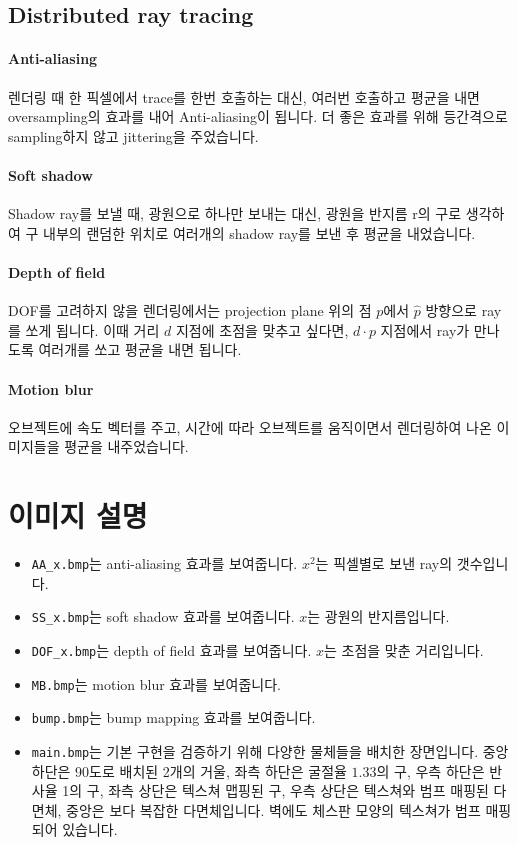 \documentclass{article}
\begin{document}
\subsection{Distributed ray tracing}

\paragraph{Anti-aliasing}

렌더링 때 한 픽셀에서 trace를 한번 호출하는 대신, 여러번 호출하고 평균을 내면 oversampling의 효과를 내어 Anti-aliasing이 됩니다.
더 좋은 효과를 위해 등간격으로 sampling하지 않고 jittering을 주었습니다.

\paragraph{Soft shadow}

Shadow ray를 보낼 때, 광원으로 하나만 보내는 대신, 광원을 반지름 r의 구로 생각하여 구 내부의 랜덤한 위치로 여러개의 shadow ray를 보낸 후 평균을 내었습니다.

\paragraph{Depth of field}

DOF를 고려하지 않을 렌더링에서는 projection plane 위의 점 $p$에서 $\hat{p}$ 방향으로 ray를 쏘게 됩니다.
이때 거리 $d$ 지점에 초점을 맞추고 싶다면, $d \cdot p$ 지점에서 ray가 만나도록 여러개를 쏘고 평균을 내면 됩니다.

\paragraph{Motion blur}

오브젝트에 속도 벡터를 주고, 시간에 따라 오브젝트를 움직이면서 렌더링하여 나온 이미지들을 평균을 내주었습니다.

\section{이미지 설명}

\begin{itemize}
  \item
    \texttt{AA\_x.bmp}는 anti-aliasing 효과를 보여줍니다.
    $x^2$는 픽셀별로 보낸 ray의 갯수입니다.
  \item
    \texttt{SS\_x.bmp}는 soft shadow 효과를 보여줍니다.
    $x$는 광원의 반지름입니다.
  \item
    \texttt{DOF\_x.bmp}는 depth of field 효과를 보여줍니다.
    $x$는 초점을 맞춘 거리입니다.
  \item
    \texttt{MB.bmp}는 motion blur 효과를 보여줍니다.
  \item
    \texttt{bump.bmp}는 bump mapping 효과를 보여줍니다.
  \item
    \texttt{main.bmp}는 기본 구현을 검증하기 위해 다양한 물체들을 배치한 장면입니다.
    중앙 하단은 90도로 배치된 2개의 거울, 좌측 하단은 굴절율 $1.33$의 구, 우측 하단은 반사율 1의 구, 좌측 상단은 텍스쳐 맵핑된 구, 우측 상단은 텍스쳐와 범프 매핑된 다면체, 중앙은 보다 복잡한 다면체입니다.
    벽에도 체스판 모양의 텍스쳐가 범프 매핑되어 있습니다.
\end{itemize}
\end{document}
